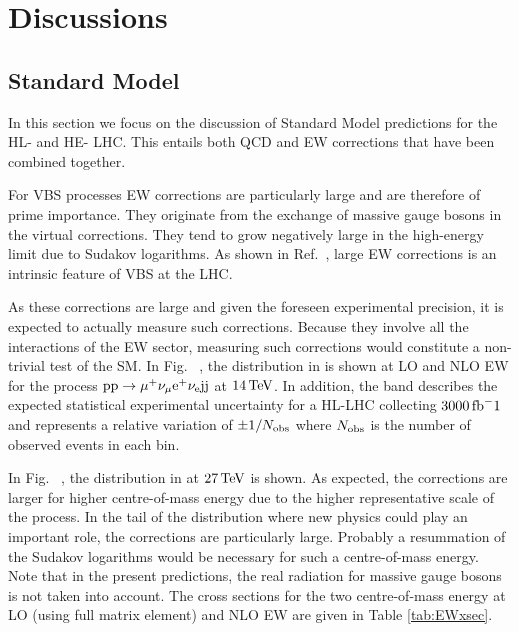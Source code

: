 \documentclass[11pt,epsf]{article}
\begin{document}
\section{Discussions}

\subsection{Standard Model}

In this section we focus on the discussion of Standard Model predictions for the HL- and HE- LHC.
This entails both QCD and EW corrections that have been combined together.


For VBS processes EW corrections are particularly large \cite{Biedermann:2016yds} and are therefore of prime importance.
They originate from the exchange of massive gauge bosons in the virtual corrections.
They tend to grow negatively large in the high-energy limit due to Sudakov logarithms.
As shown in Ref.~\cite{Biedermann:2016yds}, large EW corrections is an intrinsic feature of VBS at the LHC.

As these corrections are large and given the foreseen experimental precision, it is expected to actually measure such corrections.
Because they involve all the interactions of the EW sector, measuring such corrections would constitute a non-trivial test of the SM.
In Fig.~ , the distribution in is shown at LO and NLO EW for the process $\text{p}\text{p} \to \mu^+ \nu_{\mu} \text{e}^+ \nu_{\text{e}} \text{j}\text{j}$ at $14\,\text{TeV}$.
In addition, the band describes the expected statistical experimental uncertainty for a HL-LHC collecting $3000\fb^-1$ and represents a relative variation of $\pm1/N_{\rm obs}$ where $N_{\rm obs}$ is the number of observed events in each bin.

In Fig.~ , the distribution in at $27\,\text{TeV}$ is shown.
As expected, the corrections are larger for higher centre-of-mass energy due to the higher representative scale of the process.
In the tail of the distribution where new physics could play an important role, the corrections are particularly large.
Probably a resummation of the Sudakov logarithms would be necessary for such a centre-of-mass energy.
Note that in the present predictions, the real radiation for massive gauge bosons is not taken into account.
The cross sections for the two centre-of-mass energy at LO (using full matrix element) and NLO EW are given in Table \ref{tab:EWxsec}.
\end{document}
